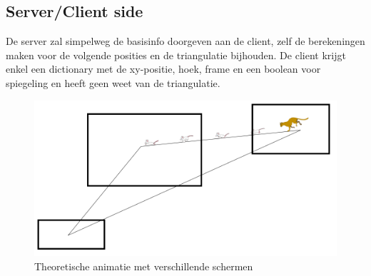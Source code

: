 \subsection{Server/Client side}

De server zal simpelweg de basisinfo doorgeven aan de client, zelf de berekeningen maken voor de volgende posities en de triangulatie bijhouden. De client krijgt enkel een dictionary met de xy-positie, hoek, frame en een boolean voor spiegeling en heeft geen weet van de triangulatie.

\begin{figure}[H]
\centering
\includegraphics[scale=0.5]{img/schermen.png}
\caption{Theoretische animatie met verschillende schermen}
\label{fig:schermen}
\end{figure}

